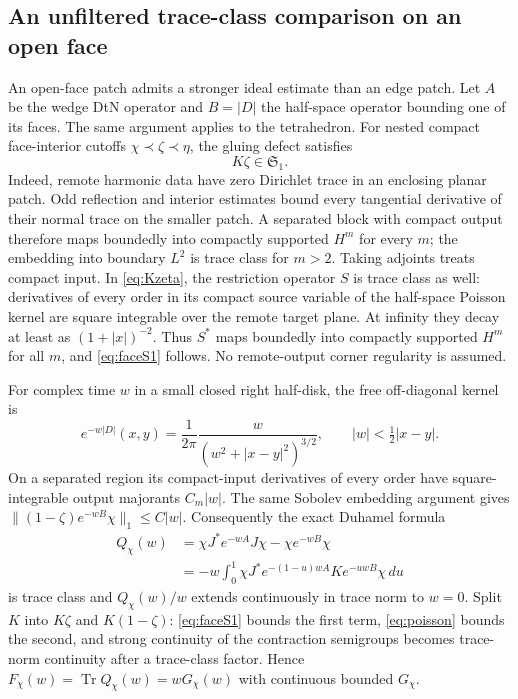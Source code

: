 \documentclass[11pt]{amsart}
\numberwithin{equation}{section}
\theoremstyle{remark}
\newcommand{\Tr}{\operatorname{Tr}}
\newcommand{\Sone}{\mathfrak{S}_1}
\begin{document}
\subsection{An unfiltered trace-class comparison on an open face}\label{subsec:face}
An open-face patch admits a stronger ideal estimate than an edge patch. Let $A$ be the wedge DtN operator and $B=|D|$ the half-space operator bounding one of its faces. The same argument applies to the tetrahedron. For nested compact face-interior cutoffs $\chi\prec\zeta\prec\eta$, the gluing defect satisfies
\begin{equation}\label{eq:faceS1}
K\zeta\in\Sone .
\end{equation}
Indeed, remote harmonic data have zero Dirichlet trace in an enclosing planar patch. Odd reflection and interior estimates bound every tangential derivative of their normal trace on the smaller patch. A separated block with compact output therefore maps boundedly into compactly supported $H^m$ for every $m$; the embedding into boundary $L^2$ is trace class for $m>2$. Taking adjoints treats compact input. In \eqref{eq:Kzeta}, the restriction operator $S$ is trace class as well: derivatives of every order in its compact source variable of the half-space Poisson kernel are square integrable over the remote target plane. At infinity they decay at least as $(1+|x|)^{-2}$. Thus $S^*$ maps boundedly into compactly supported $H^m$ for all $m$, and \eqref{eq:faceS1} follows. No remote-output corner regularity is assumed.

For complex time $w$ in a small closed right half-disk, the free off-diagonal kernel is
\begin{equation}\label{eq:poisson}
e^{-w|D|}(x,y)=\frac1{2\pi}\frac{w}{(w^2+|x-y|^2)^{3/2}},\qquad |w|<\tfrac12|x-y| .
\end{equation}
On a separated region its compact-input derivatives of every order have square-integrable output majorants $C_m|w|$. The same Sobolev embedding argument gives $\|(1-\zeta)e^{-wB}\chi\|_1\le C|w|$. Consequently the exact Duhamel formula
\begin{equation}\label{eq:Qchi}
\begin{aligned}
Q_\chi(w)&=\chi J^*e^{-wA}J\chi-\chi e^{-wB}\chi\\
&=-w\int_0^1\chi J^*e^{-(1-u)wA}Ke^{-uwB}\chi\,du
\end{aligned}
\end{equation}
is trace class and $Q_\chi(w)/w$ extends continuously in trace norm to $w=0$. Split $K$ into $K\zeta$ and $K(1-\zeta)$: \eqref{eq:faceS1} bounds the first term, \eqref{eq:poisson} bounds the second, and strong continuity of the contraction semigroups becomes trace-norm continuity after a trace-class factor. Hence $F_\chi(w)=\Tr Q_\chi(w)=wG_\chi(w)$ with continuous bounded $G_\chi$.
\end{document}
